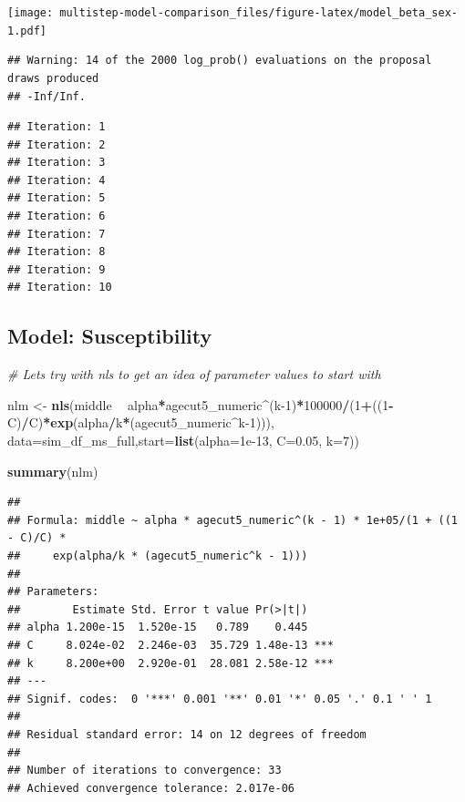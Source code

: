 \documentclass[
]{article}
\newenvironment{Shaded}{\begin{snugshade}}{\end{snugshade}}
\newcommand{\CommentTok}[1]{\textcolor[rgb]{0.56,0.35,0.01}{\textit{#1}}}
\newcommand{\DataTypeTok}[1]{\textcolor[rgb]{0.13,0.29,0.53}{#1}}
\newcommand{\DecValTok}[1]{\textcolor[rgb]{0.00,0.00,0.81}{#1}}
\newcommand{\FloatTok}[1]{\textcolor[rgb]{0.00,0.00,0.81}{#1}}
\newcommand{\KeywordTok}[1]{\textcolor[rgb]{0.13,0.29,0.53}{\textbf{#1}}}
\newcommand{\NormalTok}[1]{#1}
\newcommand{\OperatorTok}[1]{\textcolor[rgb]{0.81,0.36,0.00}{\textbf{#1}}}
\newcommand{\StringTok}[1]{\textcolor[rgb]{0.31,0.60,0.02}{#1}}
\begin{document}
\texttt{[image: multistep-model-comparison\_files/figure-latex/model\_beta\_sex-1.pdf]}

\begin{verbatim}
## Warning: 14 of the 2000 log_prob() evaluations on the proposal draws produced
## -Inf/Inf.
\end{verbatim}

\begin{verbatim}
## Iteration: 1
## Iteration: 2
## Iteration: 3
## Iteration: 4
## Iteration: 5
## Iteration: 6
## Iteration: 7
## Iteration: 8
## Iteration: 9
## Iteration: 10
\end{verbatim}

\hypertarget{model-susceptibility}{%
\subsection{Model: Susceptibility}\label{model-susceptibility}}

\begin{Shaded}
\begin{Highlighting}[]
\CommentTok{# Lets try with nls to get an idea of parameter values to start with}

\NormalTok{nlm <-}\StringTok{ }\KeywordTok{nls}\NormalTok{(middle }\OperatorTok{~}\StringTok{ }\NormalTok{alpha}\OperatorTok{*}\NormalTok{agecut5_numeric}\OperatorTok{^}\NormalTok{(k}\DecValTok{-1}\NormalTok{)}\OperatorTok{*}\DecValTok{100000}\OperatorTok{/}\NormalTok{(}\DecValTok{1}\OperatorTok{+}\NormalTok{((}\DecValTok{1}\OperatorTok{-}\NormalTok{C)}\OperatorTok{/}\NormalTok{C)}\OperatorTok{*}\KeywordTok{exp}\NormalTok{(alpha}\OperatorTok{/}\NormalTok{k}\OperatorTok{*}\NormalTok{(agecut5_numeric}\OperatorTok{^}\NormalTok{k}\DecValTok{-1}\NormalTok{))), }\DataTypeTok{data=}\NormalTok{sim_df_ms_full,}\DataTypeTok{start=}\KeywordTok{list}\NormalTok{(}\DataTypeTok{alpha=}\FloatTok{1e-13}\NormalTok{, }\DataTypeTok{C=}\FloatTok{0.05}\NormalTok{, }\DataTypeTok{k=}\DecValTok{7}\NormalTok{))}

\KeywordTok{summary}\NormalTok{(nlm)}
\end{Highlighting}
\end{Shaded}

\begin{verbatim}
## 
## Formula: middle ~ alpha * agecut5_numeric^(k - 1) * 1e+05/(1 + ((1 - C)/C) * 
##     exp(alpha/k * (agecut5_numeric^k - 1)))
## 
## Parameters:
##        Estimate Std. Error t value Pr(>|t|)    
## alpha 1.200e-15  1.520e-15   0.789    0.445    
## C     8.024e-02  2.246e-03  35.729 1.48e-13 ***
## k     8.200e+00  2.920e-01  28.081 2.58e-12 ***
## ---
## Signif. codes:  0 '***' 0.001 '**' 0.01 '*' 0.05 '.' 0.1 ' ' 1
## 
## Residual standard error: 14 on 12 degrees of freedom
## 
## Number of iterations to convergence: 33 
## Achieved convergence tolerance: 2.017e-06
\end{verbatim}
\end{document}
